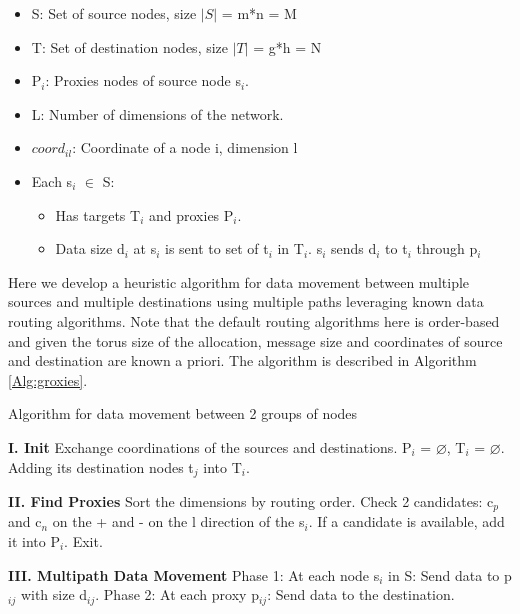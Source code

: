 \begin{itemize}
\item S: Set of source nodes, size $|S|$ = m*n = M
\item T: Set of destination nodes, size $|T|$ = g*h = N
\item P$_i$: Proxies nodes of source node s$_i$.
\item L: Number of dimensions of the network.
\item $coord_{il}$: Coordinate of a node i, dimension l
\item Each s$_i$ $\in$ S:
\begin{itemize}
\item Has targets T$_i$ and proxies P$_i$.
\item Data size d$_i$ at s$_i$ is sent to set of t$_i$ in T$_i$. s$_i$ sends d$_{i}$ to t$_i$ through p$_i$

\end{itemize}
\end{itemize}

Here we develop a heuristic algorithm for data movement between multiple sources and multiple destinations using multiple paths leveraging known  data routing algorithms. Note that the default routing algorithms here is order-based and given the torus size of the allocation, message size and coordinates of source and destination are known a priori. The algorithm is described in Algorithm \ref{Alg:groxies}.

\begin{algorithm}
\caption{Algorithm for data movement between 2 groups of nodes}
\begin{algorithmic}

\STATE \textbf{I. Init}
\STATE Exchange coordinations of the sources and destinations.
\STATE P$_i$ = $\varnothing$, T$_i$ = $\varnothing$.
\STATE Adding its destination nodes t$_j$ into T$_i$.
\ENDFOR

\STATE \textbf{II. Find Proxies}
\STATE Sort the dimensions by routing order.
\STATE Check 2 candidates: c$_p$ and c$_n$ on the + and - on the l direction of the s$_i$. %
\STATE If a candidate is available, add it into P$_i$.
\ENDFOR
\ENDFOR
{} \STATE Exit. \ENDIF
\ENDFOR

\STATE \textbf{III. Multipath Data Movement}
\STATE Phase 1: At each node s$_i$ in S:
\STATE Send data to p$_{ij}$ with size d$_{ij}$.
\ENDFOR
\STATE Phase 2: At each proxy p$_{ij}$:
\STATE Send data to the destination.
\end{algorithmic}
\label{Alg:groxies}
\end{algorithm}

